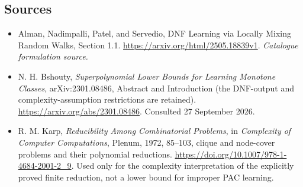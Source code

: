 \documentclass[11pt,a4paper]{article}
\numberwithin{equation}{section}
\begin{document}
\subsection{Sources}
\begin{itemize}\raggedright
\item[\textnormal{[S1]}]\hypertarget{source:statement:1}{} Alman, Nadimpalli, Patel, and Servedio, DNF Learning via Locally Mixing Random Walks, Section 1.1.
\url{https://arxiv.org/html/2505.18839v1}.
{\small\textit{Catalogue formulation source.}}
\item[\textnormal{[E1]}]\hypertarget{extra:statement:1}{}
N. H. Bshouty, \emph{Superpolynomial Lower Bounds for Learning Monotone
Classes}, arXiv:2301.08486, Abstract and Introduction (the DNF-output
and complexity-assumption restrictions are retained).
\url{https://arxiv.org/abs/2301.08486}. Consulted 27 September 2026.
\item[\textnormal{[E2]}]\hypertarget{extra:statement:2}{}
R. M. Karp, \emph{Reducibility Among Combinatorial Problems}, in
\emph{Complexity of Computer Computations}, Plenum, 1972, 85--103,
clique and node-cover problems and their polynomial reductions.
\url{https://doi.org/10.1007/978-1-4684-2001-2_9}.
Used only for the complexity interpretation of the explicitly proved
finite reduction, not a lower bound for improper PAC learning.
\end{itemize}
\end{document}
